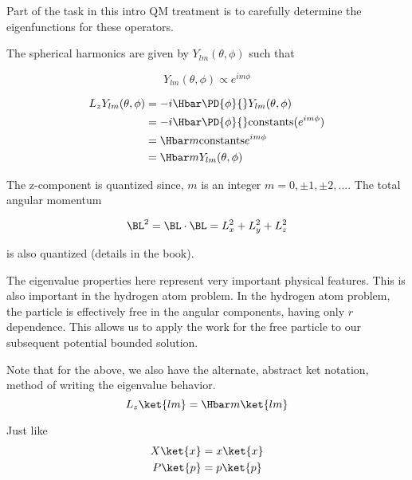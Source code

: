 Part of the task in this intro QM treatment is to carefully determine the eigenfunctions for these operators.

The spherical harmonics are given by \(Y_{lm}(\theta, \phi)\) such that

\begin{equation}\label{eqn:PHY356Foct19:1004}
Y_{lm}(\theta, \phi) \propto e^{i m \phi}
\end{equation}

\begin{equation}\label{eqn:lecture6OrbitalandIntrinsicMomentum:2080}
\begin{aligned}
L_z Y_{lm}(\theta, \phi)
&= -i \Hbar \PD{\phi}{} Y_{lm}(\theta, \phi) \\
&= -i \Hbar \PD{\phi}{} \text{constants} (e^{im \phi}) \\
&= \Hbar m \text{constants} e^{i m \phi} \\
&= \Hbar m Y_{lm}(\theta, \phi)
\end{aligned}
\end{equation}

The z-component is quantized since, \(m\) is an integer \(m = 0, \pm 1, \pm 2, ...\).  The total angular momentum

\begin{equation}\label{eqn:PHY356Foct19:1005}
\BL^2 = \BL \cdot \BL = L_x^2 + L_y^2 + L_z^2
\end{equation}

is also quantized (details in the book).

The eigenvalue properties here represent very important physical features.  This is also important in the hydrogen atom problem.  In the hydrogen atom problem, the particle is effectively free in the angular components, having only \(r\) dependence.  This allows us to apply the work for the free particle to our subsequent potential bounded solution.

Note that for the above, we also have the alternate, abstract ket notation, method of writing the eigenvalue behavior.
\begin{equation}\label{eqn:PHY356Foct19:1006}
L_z \ket{lm} = \Hbar m \ket{lm}
\end{equation}

Just like
\begin{equation}\label{eqn:PHY356Foct19:1007}
\begin{aligned}
X \ket{x} &= x \ket{x} \\
P \ket{p} &= p \ket{p}
\end{aligned}
\end{equation}

